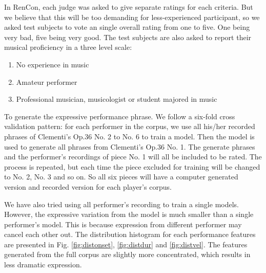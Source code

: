 In RenCon, each judge was asked to give separate ratings for each criteria. But we believe that this will be too demanding for less-experienced participant, so we asked test subjects to vote an single overall rating from one to five. One being very bad, five being very good. The test subjects are also asked to report their musical proficiency in a three level scale:
\begin{enumerate}
   \item No experience in music 
   \item Amateur performer
   \item Professional musician, musicologist or student majored in music
\end{enumerate}

To generate the expressive performance phrase. We follow a six-fold cross validation pattern: for each performer in the corpus, we use all his/her recorded phrases of Clementi's Op.36 No. 2 to No. 6 to train a model. Then the model is used to generate all phrases from Clementi's Op.36 No. 1. The generate phrases and the performer's recordings of piece No. 1 will all be included to be rated. The process is repeated, but each time the piece excluded for training will be changed to No. 2, No. 3 and so on. So all six pieces will have a computer generated version and recorded version for each player's corpus.


We have also tried using all performer's recording to train a single models. However, the expressive variation from the model is much smaller than a single performer's model. This is because expression from different performer may cancel each other out. The distribution histogram for each performance features are presented in Fig. \ref{fig:distonset}, \ref{fig:distdur} and \ref{fig:distvel}. The features generated from the full corpus are slightly more concentrated, which results in less dramatic expression.


